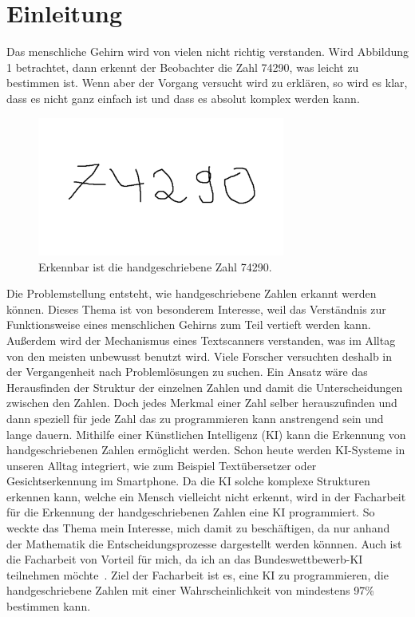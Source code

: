 \documentclass[11pt]{article}
\begin{document}
\section{Einleitung}
Das menschliche Gehirn wird von vielen nicht richtig verstanden. Wird Abbildung 1 betrachtet, dann erkennt der Beobachter die Zahl 74290,
was leicht zu bestimmen ist. Wenn aber der Vorgang versucht wird zu erklären, so wird es klar, dass es nicht ganz einfach ist
und dass es absolut komplex werden kann.
\begin{figure}[h]
    \centering
    \includegraphics[width=230pt, keepaspectratio]{images/zahlen}
    \caption[Handgeschriebene]{Erkennbar ist die handgeschriebene Zahl 74290.}
\end{figure}
Die Problemstellung entsteht, wie handgeschriebene Zahlen erkannt werden können.
Dieses Thema ist von besonderem Interesse, weil das Verständnis zur Funktionsweise eines menschlichen Gehirns zum Teil vertieft werden kann.
Außerdem wird der Mechanismus eines Textscanners verstanden, was im Alltag von den meisten unbewusst benutzt wird.
Viele Forscher versuchten deshalb in der Vergangenheit nach Problemlösungen zu suchen. Ein Ansatz wäre das Herausfinden
der Struktur der einzelnen Zahlen und damit die Unterscheidungen zwischen den Zahlen.
Doch jedes Merkmal einer Zahl selber herauszufinden und dann speziell für jede Zahl das zu programmieren kann
anstrengend sein und lange dauern. Mithilfe einer Künstlichen Intelligenz (KI) kann die Erkennung von handgeschriebenen Zahlen ermöglicht werden. 
Schon heute werden KI-Systeme in unseren Alltag integriert, wie zum Beispiel Textübersetzer oder Gesichtserkennung im Smartphone. Da die KI solche
komplexe Strukturen erkennen kann, welche ein Mensch vielleicht nicht erkennt, wird in der Facharbeit für die Erkennung der handgeschriebenen Zahlen eine KI programmiert.
So weckte das Thema mein Interesse, mich damit zu beschäftigen, da nur anhand der Mathematik die Entscheidungsprozesse dargestellt werden könnnen.
Auch ist die Facharbeit von Vorteil für mich, da ich an das Bundeswettbewerb-KI teilnehmen möchte~\cite{10}.
Ziel der Facharbeit ist es, eine KI zu programmieren, die handgeschriebene Zahlen mit einer Wahrscheinlichkeit von mindestens 97\% bestimmen kann.
\end{document}
